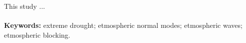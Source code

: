 This study ...
\\
\\


\noindent \textbf{Keywords:} extreme drought; etmospheric normal modes; etmospheric waves; etmospheric blocking.
